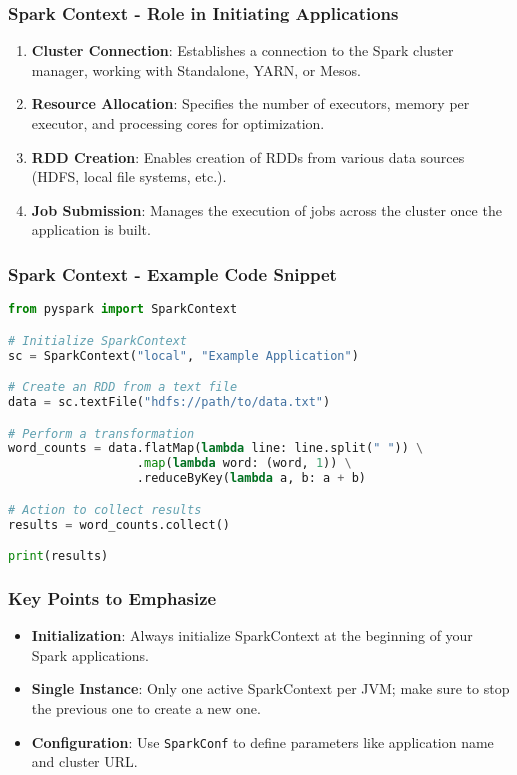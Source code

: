 \documentclass[aspectratio=169]{beamer}
\begin{document}
\begin{frame}[fragile]
    \frametitle{Spark Context - Role in Initiating Applications}
    
    \begin{enumerate}
        \item \textbf{Cluster Connection}: Establishes a connection to the Spark cluster manager, working with Standalone, YARN, or Mesos.
        
        \item \textbf{Resource Allocation}: Specifies the number of executors, memory per executor, and processing cores for optimization.
        
        \item \textbf{RDD Creation}: Enables creation of RDDs from various data sources (HDFS, local file systems, etc.).
        
        \item \textbf{Job Submission}: Manages the execution of jobs across the cluster once the application is built.
    \end{enumerate}
\end{frame}

\begin{frame}[fragile]
    \frametitle{Spark Context - Example Code Snippet}
    
    \begin{lstlisting}[language=Python]
from pyspark import SparkContext

# Initialize SparkContext
sc = SparkContext("local", "Example Application")

# Create an RDD from a text file
data = sc.textFile("hdfs://path/to/data.txt")

# Perform a transformation
word_counts = data.flatMap(lambda line: line.split(" ")) \
                  .map(lambda word: (word, 1)) \
                  .reduceByKey(lambda a, b: a + b)

# Action to collect results
results = word_counts.collect()

print(results)
    \end{lstlisting}
\end{frame}

\begin{frame}[fragile]
    \frametitle{Key Points to Emphasize}
    
    \begin{itemize}
        \item \textbf{Initialization}: Always initialize SparkContext at the beginning of your Spark applications.
        
        \item \textbf{Single Instance}: Only one active SparkContext per JVM; make sure to stop the previous one to create a new one.
        
        \item \textbf{Configuration}: Use \texttt{SparkConf} to define parameters like application name and cluster URL.
    \end{itemize}
\end{frame}
\end{document}
